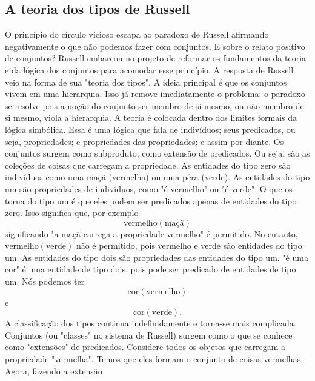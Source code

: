    \subsection{A teoria dos tipos de Russell}
      O princípio do círculo vicioso escapa ao paradoxo de Russell afirmando 
      negativamente o que não podemos fazer com conjuntos. E sobre o relato positivo 
      de conjuntos? Russell embarcou no projeto de reformar os fundamentos da teoria 
      e da lógica dos conjuntos para acomodar esse princípio. A resposta de Russell 
      veio na forma de sua "teoria dos tipos". A ideia principal é que os conjuntos 
      vivem em uma hierarquia. Isso já remove imediatamente o problema: o paradoxo 
      se resolve pois a noção do conjunto ser membro de si mesmo, ou não membro de 
      si mesmo, viola a hierarquia.\newline
      A teoria é colocada dentro dos limites formais da lógica simbólica. Essa é uma 
      lógica que fala de indivíduos; seus predicados, ou seja, propriedades; e 
      propriedades das propriedades; e assim por diante. Os conjuntos surgem como 
      subproduto, como extensão de predicados. Ou seja, são as coleções de coisas 
      que carregam a propriedade.\newline
      As entidades do tipo zero são indivíduos como uma maçã (vermelha) ou uma 
      pêra (verde). As entidades do tipo um são propriedades de indivíduos, 
      como "é vermelho" ou "é verde". O que os torna do tipo um é que eles podem 
      ser predicados apenas de entidades do tipo zero. Isso significa que, por 
      exemplo $$\textrm{vermelho}(\textrm{maçã})$$ significando "a maçã carrega 
      a propriedade vermelho" é permitido. No entanto, 
      $\textrm{vermelho}(\textrm{verde})$ não é permitido, pois vermelho e verde 
      são entidades do tipo um.\newline
      As entidades do tipo dois são propriedades das entidades do tipo um. 
      "é uma cor" é uma entidade de tipo dois, pois pode ser predicado de entidades 
      de tipo um. Nós podemos ter $$\textrm{cor}(\textrm{vermelho})$$ e 
      $$\textrm{cor}(\textrm{verde}).$$ A classificação dos tipos continua 
      indefinidamente e torna-se mais complicada. Conjuntos (ou "classes" no sistema 
      de Russell) surgem como o que se conhece como "extensões" de predicados.
      \newline
      Considere todos os objetos que carregam a propriedade "vermelha". Temos 
      que eles formam o conjunto de coisas vermelhas. Agora, fazendo a extensão 
